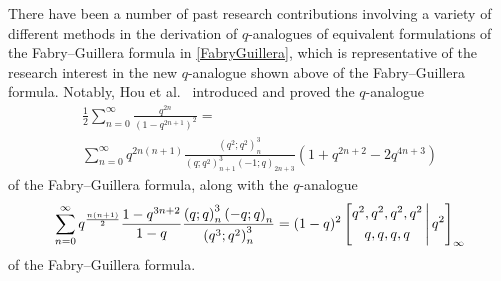 \documentclass[12pt]{article}
\begin{document}
 There have been a number of past research contributions involving a variety of different methods in the derivation of $q$-analogues 
 of equivalent formulations of the Fabry--Guillera formula in \eqref{FabryGuillera}, 
 which is representative of the research interest in the new $q$-analogue shown above
 of the Fabry--Guillera formula. 
 Notably, Hou et al.\ \cite{HouKrattenthalerSun2019} introduced and proved 
 the $q$-analogue
\begin{multline*}
 \frac{1}{2} \sum_{n=0}^{\infty} \frac{q^{2n}}{(1-q^{2n+1})^{2}} = \\ 
 \sum_{n=0}^{\infty} q^{2n(n+1)} 
 \frac{ \left( q^{2};q^2 \right)_{n}^{3} }{ \left( q;q^2 \right)_{n+1}^{3} 
 \left( -1; q \right)_{2n+3} } (1+q^{2n+2} - 2 q^{4n+3})
\end{multline*}
 of the Fabry--Guillera formula, along with the $q$-analogue 
\begin{equation}\label{secondHKS}
 \sum_{n=0}^{\infty} q^{\frac{n(n+1)}{2}} 
 \frac{1-q^{3n+2}}{1-q} \frac{ \left( q;q \right)_{n}^{3} \left( -q;q \right)_{n} }{ 
 \left( q^{3};q^{2} \right)_{n}^{3} } 
 = (1-q)^2 \left[ \begin{matrix} 
 q^{2}, q^{2}, q^{2}, q^{2} \vspace{1mm} \\ 
 q, q, q, q \end{matrix} \, \Bigg| \, q^{2} \right]_{\infty}
\end{equation}
 of the Fabry--Guillera formula. 
\end{document}
